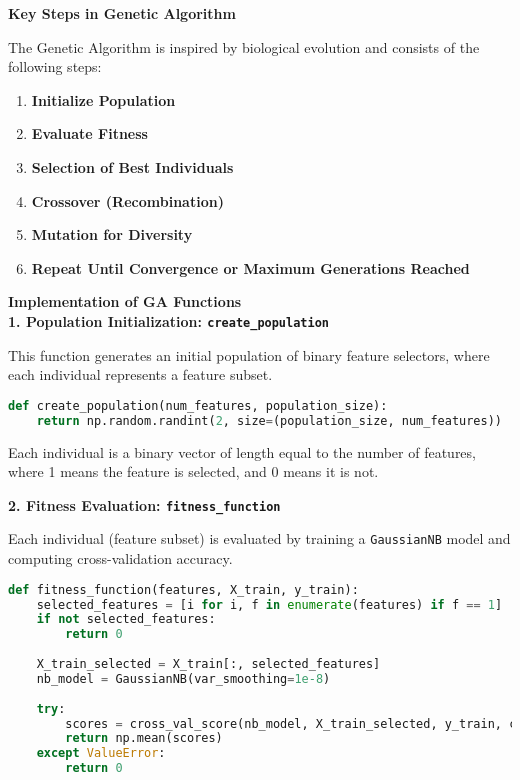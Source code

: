 ${}$\\
\textbf{Key Steps in Genetic Algorithm}

${}$\\
The Genetic Algorithm is inspired by biological evolution and consists of the following steps:

\begin{enumerate}
    \item \textbf{Initialize Population}
    \item \textbf{Evaluate Fitness}
    \item \textbf{Selection of Best Individuals}
    \item \textbf{Crossover (Recombination)}
    \item \textbf{Mutation for Diversity}
    \item \textbf{Repeat Until Convergence or Maximum Generations Reached}
\end{enumerate}

\textbf{Implementation of GA Functions}
${}$\\
\textbf{1. Population Initialization: \texttt{create\_population}}

This function generates an initial population of binary feature selectors, where each individual represents a feature subset.

\begin{lstlisting}[language=Python]
def create_population(num_features, population_size):
    return np.random.randint(2, size=(population_size, num_features))
\end{lstlisting}

Each individual is a binary vector of length equal to the number of features, where 1 means the feature is selected, and 0 means it is not.

${}$\\
\textbf{2. Fitness Evaluation: \texttt{fitness\_function}}

Each individual (feature subset) is evaluated by training a \texttt{GaussianNB} model and computing cross-validation accuracy.

\begin{lstlisting}[language=Python]
def fitness_function(features, X_train, y_train):
    selected_features = [i for i, f in enumerate(features) if f == 1]
    if not selected_features:  
        return 0 
    
    X_train_selected = X_train[:, selected_features]
    nb_model = GaussianNB(var_smoothing=1e-8)
    
    try:
        scores = cross_val_score(nb_model, X_train_selected, y_train, cv=5)
        return np.mean(scores)
    except ValueError:
        return 0
\end{lstlisting}

